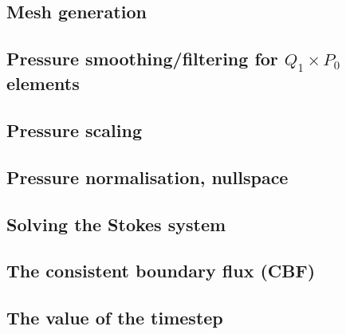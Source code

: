 \subsection{Mesh generation} \label{sec:meshes}  %
\newpage %
\subsection{Pressure smoothing/filtering for $Q_1\times P_0$ elements \label{psmoothing}} 
\newpage %
\subsection{Pressure scaling \label{pscaling}}  %
\newpage %
\subsection{Pressure normalisation, nullspace\label{ss_pnorm}}  %
\newpage %
\subsection{Solving the Stokes system \label{sec:solvers}}  %
\newpage %
\subsection{The consistent boundary flux (CBF) \label{ss:cbf}}  %
\newpage %
\subsection{The value of the timestep}\label{ss:cfl}  %
\newpage %
